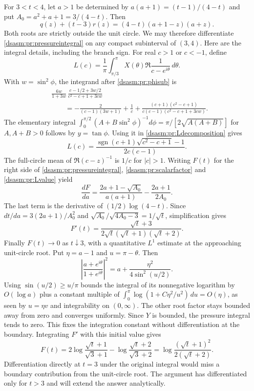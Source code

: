 \documentclass[11pt,letterpaper]{article}
\theoremstyle{remark}\newtheorem{remark}[theorem]{Remark}
\begin{document}
For $3<t<4$, let $a>1$ be determined by
$a(a+1)=(t-1)/(4-t)$ and put $A_0=a^2+a+1=3/(4-t)$. Then
\begin{equation}\label{dsasm:pr:scalarfactor}
 q(z)+(t-3)r(z)=(4-t)(a+1-z)(a+z).
\end{equation}
Both roots are strictly outside the unit circle. We may therefore
differentiate \eqref{dsasm:pr:pressureintegral} on any compact subinterval of
$(3,4)$. Here are the integral details, including the branch sign.
For real $c>1$ or $c<-1$, define
\[
 L(c)=\frac1\pi\int_{\pi/3}^{\pi}
 X(\theta)\Re\frac1{c-e^{i\theta}}\,d\theta.
\]
With $w=\sin^2\phi$, the integrand after \eqref{dsasm:pr:phisub} is
\begin{equation}\label{dsasm:pr:Ldecomposition}
\begin{split}
 &\frac{6w}{1+3w}\,
 \frac{c-1/2+3w/2}{c^2-c+1+3cw}\\
 &\qquad=-\frac2{(c-1)(3w+1)}+\frac1c
 +\frac{(c+1)(c^2-c+1)}{c(c-1)(c^2-c+1+3cw)}.
\end{split}
\end{equation}
The elementary integral
$\int_0^{\pi/2}(A+B\sin^2\phi)^{-1}d\phi
 =\pi/[2\sqrt{A(A+B)}]$ for $A,A+B>0$ follows by $y=\tan\phi$.
Using it in \eqref{dsasm:pr:Ldecomposition} gives
\begin{equation}\label{dsasm:pr:Lvalue}
 L(c)=\frac{\operatorname{sgn}(c+1)\sqrt{c^2-c+1}-1}{2c(c-1)}.
\end{equation}
The full-circle mean of $\Re(c-z)^{-1}$ is $1/c$ for $|c|>1$.
Writing $F(t)$ for the right side of \eqref{dsasm:pr:pressureintegral},
\eqref{dsasm:pr:scalarfactor} and \eqref{dsasm:pr:Lvalue} yield
\begin{equation}\label{dsasm:pr:dFda}
 \frac{dF}{da}=
 \frac{2a+1-\sqrt{A_0}}{a(a+1)}-\frac{2a+1}{2A_0}.
\end{equation}
The last term is the derivative of $(1/2)\log(4-t)$.
Since $dt/da=3(2a+1)/A_0^2$ and
$\sqrt{A_0}/\sqrt{4A_0-3}=1/\sqrt t$, simplification gives
\[
 F'(t)=\frac{\sqrt t+3}{2\sqrt t(\sqrt t+1)(\sqrt t+2)}.
\]
Finally $F(t)\to0$ as $t\downarrow3$, with a quantitative
$L^1$ estimate at the approaching unit-circle root. Put $\eta=a-1$
and $u=\pi-\theta$. Then
\[
 \left|\frac{a+e^{i\theta}}{1+e^{i\theta}}\right|^2
 =a+\frac{\eta^2}{4\sin^2(u/2)}.
\]
Using $\sin(u/2)\ge u/\pi$ bounds the integral of its nonnegative
logarithm by $O(\log a)$ plus a constant multiple of
$\int_0^\pi\log(1+C\eta^2/u^2)\,du=O(\eta)$, as seen by $u=\eta v$
and integrability on $(0,\infty)$. The other root factor stays bounded
away from zero and converges uniformly. Since $Y$ is bounded, the
pressure integral tends to zero. This fixes the integration constant
without differentiation at the boundary.
Integrating $F'$ with this initial value gives
\[
 F(t)=2\log\frac{\sqrt t+1}{\sqrt3+1}
       -\log\frac{\sqrt t+2}{\sqrt3+2}
     =\log\frac{(\sqrt t+1)^2}{2(\sqrt t+2)}.
\]
Differentiation directly at $t=3$ under the original integral would
miss a boundary contribution from the unit-circle root. The argument
has differentiated only for $t>3$ and will extend the answer analytically.
\end{document}
